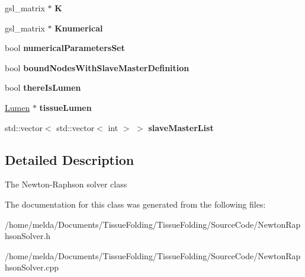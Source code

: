 \begin{DoxyCompactItemize}
\item 
\hypertarget{classNewtonRaphsonSolver_a4e9ffc424dd37c6c00f9de3d7ac455ed}{}gsl\+\_\+matrix $\ast$ {\bfseries K}\label{classNewtonRaphsonSolver_a4e9ffc424dd37c6c00f9de3d7ac455ed}

\item 
\hypertarget{classNewtonRaphsonSolver_a08b1f04a341e956ea5245a1359b27530}{}gsl\+\_\+matrix $\ast$ {\bfseries Knumerical}\label{classNewtonRaphsonSolver_a08b1f04a341e956ea5245a1359b27530}

\item 
\hypertarget{classNewtonRaphsonSolver_a9c505bede5b8a216007f1a683ad18321}{}bool {\bfseries numerical\+Parameters\+Set}\label{classNewtonRaphsonSolver_a9c505bede5b8a216007f1a683ad18321}

\item 
\hypertarget{classNewtonRaphsonSolver_ac00970bee6f2c4e1ed503e9c8df65e6d}{}bool {\bfseries bound\+Nodes\+With\+Slave\+Master\+Definition}\label{classNewtonRaphsonSolver_ac00970bee6f2c4e1ed503e9c8df65e6d}

\item 
\hypertarget{classNewtonRaphsonSolver_aa77c77519d63bc3477d1e1cb6299af9f}{}bool {\bfseries there\+Is\+Lumen}\label{classNewtonRaphsonSolver_aa77c77519d63bc3477d1e1cb6299af9f}

\item 
\hypertarget{classNewtonRaphsonSolver_aae59752692242a0dff31dc20257d8fe6}{}\hyperlink{classLumen}{Lumen} $\ast$ {\bfseries tissue\+Lumen}\label{classNewtonRaphsonSolver_aae59752692242a0dff31dc20257d8fe6}

\item 
\hypertarget{classNewtonRaphsonSolver_a08e76823173b89fe71fac26ba4edc191}{}std\+::vector$<$ std\+::vector$<$ int $>$ $>$ {\bfseries slave\+Master\+List}\label{classNewtonRaphsonSolver_a08e76823173b89fe71fac26ba4edc191}

\end{DoxyCompactItemize}


\subsection{Detailed Description}
The Newton-\/\+Raphson solver class 

The documentation for this class was generated from the following files\+:\begin{DoxyCompactItemize}
\item 
/home/melda/\+Documents/\+Tissue\+Folding/\+Tissue\+Folding/\+Source\+Code/Newton\+Raphson\+Solver.\+h\item 
/home/melda/\+Documents/\+Tissue\+Folding/\+Tissue\+Folding/\+Source\+Code/Newton\+Raphson\+Solver.\+cpp\end{DoxyCompactItemize}
